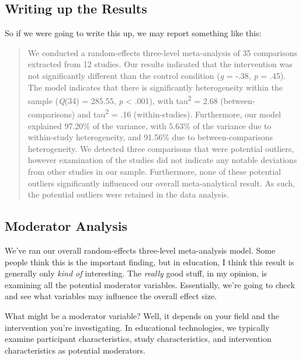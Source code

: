 \documentclass[
]{book}
\begin{document}
\hypertarget{writing-up-the-results-1}{%
\subsection{Writing up the Results}\label{writing-up-the-results-1}}

So if we were going to write this up, we may report something like this:

\begin{quote}
We conducted a random-effects three-level meta-analysis of 35 comparisons extracted from 12 studies. Our results indicated that the intervention was not significantly different than the control condition (\emph{g} = -.38, \emph{p} = .45). The model indicates that there is significantly heterogeneity within the sample (\emph{Q}(34) = 285.55, \emph{p} \textless{} .001), with tau\textsuperscript{2} = 2.68 (between-comparisons) and tau\textsuperscript{2} = .16 (within-studies). Furthermore, our model explained 97.20\% of the variance, with 5.63\% of the variance due to within-study heterogeneity, and 91.56\% due to between-comparisons heterogeneity. We detected three comparisons that were potential outliers, however examination of the studies did not indicate any notable deviations from other studies in our sample. Furthermore, none of these potential outliers significantly influenced our overall meta-analytical result. As such, the potential outliers were retained in the data analysis.
\end{quote}

\hypertarget{moderator-analysis-1}{%
\subsection{Moderator Analysis}\label{moderator-analysis-1}}

We've ran our overall random-effects three-level meta-analysis model. Some people think this is the important finding, but in education, I think this result is generally only \emph{kind of} interesting. The \emph{really} good stuff, in my opinion, is examining all the potential moderator variables. Essentially, we're going to check and see what variables may influence the overall effect size.

What might be a moderator variable? Well, it depends on your field and the intervention you're investigating. In educational technologies, we typically examine participant characteristics, study characteristics, and intervention characteristics as potential moderators.
\end{document}
